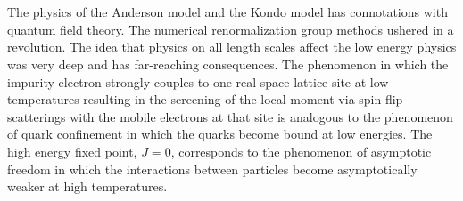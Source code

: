 \documentclass[twoside]{report}
\numberwithin{equation}{section}
\begin{document}
\\\\ The physics of the Anderson model and the Kondo model has connotations with quantum field theory. The numerical renormalization group methods ushered in a revolution. The idea that physics on all length scales affect the low energy physics was very deep and has far-reaching consequences. The phenomenon in which the impurity electron strongly couples to one real space lattice site at low temperatures resulting in the screening of the local moment via spin-flip scatterings with the mobile electrons at that site is analogous to the phenomenon of quark confinement in which the quarks become bound at low energies. The high energy fixed point, \(J=0\), corresponds to the phenomenon of asymptotic freedom in which the interactions between particles become asymptotically weaker at high temperatures.
\end{document}
